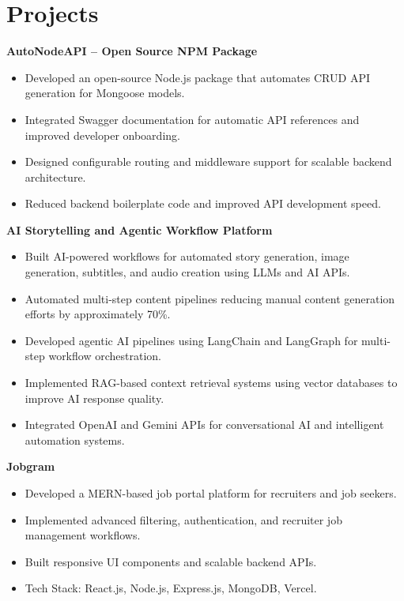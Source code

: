 \documentclass[10pt,a4paper]{article}
\begin{document}
\section*{Projects}
\textbf{AutoNodeAPI -- Open Source NPM Package}
\begin{itemize}
  \item Developed an open-source Node.js package that automates CRUD API generation for Mongoose models.
  \item Integrated Swagger documentation for automatic API references and improved developer onboarding.
  \item Designed configurable routing and middleware support for scalable backend architecture.
  \item Reduced backend boilerplate code and improved API development speed.
\end{itemize}

\textbf{AI Storytelling and Agentic Workflow Platform}
\begin{itemize}
  \item Built AI-powered workflows for automated story generation, image generation, subtitles, and audio creation using LLMs and AI APIs.
  \item Automated multi-step content pipelines reducing manual content generation efforts by approximately 70\%.
  \item Developed agentic AI pipelines using LangChain and LangGraph for multi-step workflow orchestration.
  \item Implemented RAG-based context retrieval systems using vector databases to improve AI response quality.
  \item Integrated OpenAI and Gemini APIs for conversational AI and intelligent automation systems.
\end{itemize}

\textbf{Jobgram}
\begin{itemize}
  \item Developed a MERN-based job portal platform for recruiters and job seekers.
  \item Implemented advanced filtering, authentication, and recruiter job management workflows.
  \item Built responsive UI components and scalable backend APIs.
  \item Tech Stack: React.js, Node.js, Express.js, MongoDB, Vercel.
\end{itemize}
\end{document}
